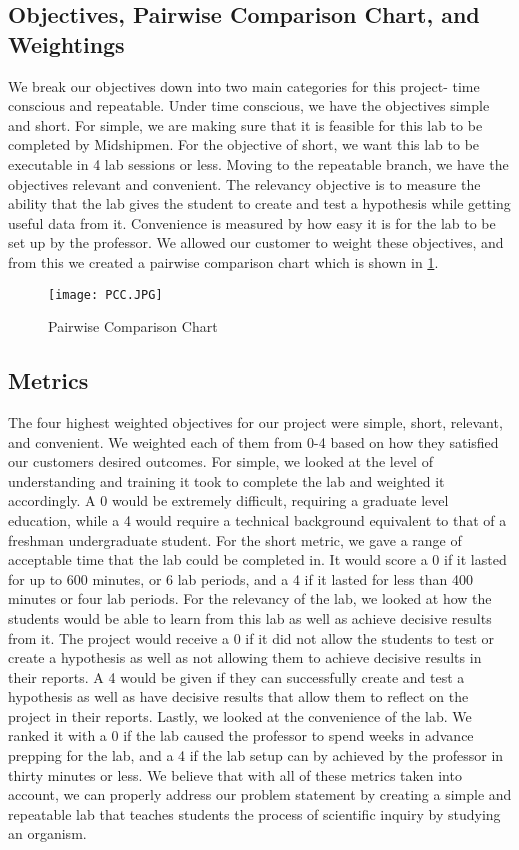 \documentclass{article}
\begin{document}
\subsection{Objectives, Pairwise Comparison Chart, and Weightings}
 We break our objectives down into two main categories for this project- time conscious and repeatable. Under time conscious, we have the objectives simple and short. For simple, we are making sure that it is feasible for this lab to be completed by Midshipmen. For the objective of short, we want this lab to be executable in 4 lab sessions or less. Moving to the repeatable branch, we have the objectives relevant and convenient. The relevancy objective is to measure the ability that the lab gives the student to create and test a hypothesis while getting useful data from it. Convenience is measured by how easy it is for the lab to be set up by the professor. We allowed our customer to weight these objectives, and from this we created a pairwise comparison chart which is shown in \ref{fig:pcc}. 

\begin{figure}[ht!]
\centering
\texttt{[image: PCC.JPG]}
\caption{Pairwise Comparison Chart}
\label{fig:pcc}
\end{figure}

\subsection{Metrics}
 The four highest weighted objectives for our project were simple, short, relevant, and convenient. We weighted each of them from 0-4 based on how they satisfied our customers desired outcomes. For simple, we looked at the level of understanding and training it took to complete the lab and weighted it accordingly. A 0 would be extremely difficult, requiring a graduate level education, while a 4 would require a technical background equivalent to that of a freshman undergraduate student. For the short metric, we gave a range of acceptable time that the lab could be completed in. It would score a 0 if it lasted for up to 600 minutes, or 6 lab periods, and a 4 if it lasted for less than 400 minutes or four lab periods. For the relevancy of the lab, we looked at how the students would be able to learn from this lab as well as achieve decisive results from it. The project would receive a 0 if it did not allow the students to test or create a hypothesis as well as not allowing them to achieve decisive results in their reports. A 4 would be given if they can successfully create and test a hypothesis as well as have decisive results that allow them to reflect on the project in their reports. Lastly, we looked at the convenience of the lab. We ranked it with a 0 if the lab caused the professor to spend weeks in advance prepping for the lab, and a 4 if the lab setup can by achieved by the professor in thirty minutes or less. We believe that with all of these metrics taken into account, we can properly address our problem statement by creating a simple and repeatable lab that teaches students the process of scientific inquiry by studying an organism.
\end{document}
